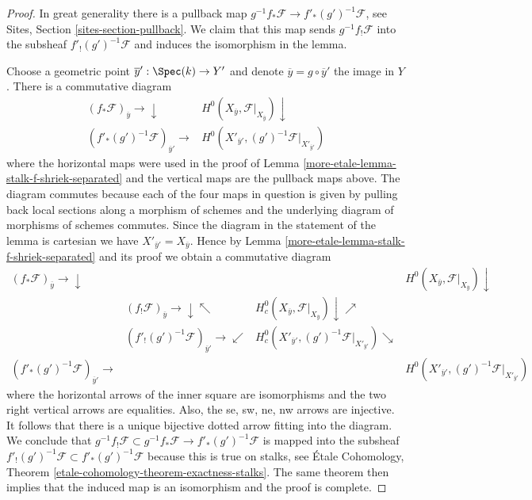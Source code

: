 \begin{proof}
In great generality there is a pullback map
$g^{-1}f_*\mathcal{F} \to f'_*(g')^{-1}\mathcal{F}$, see
Sites, Section \ref{sites-section-pullback}.
We claim that this map sends $g^{-1}f_!\mathcal{F}$
into the subsheaf $f'_!(g')^{-1}\mathcal{F}$
and induces the isomorphism in the lemma.

\medskip\noindent
Choose a geometric point $\overline{y}': \Spec(k) \to Y'$ and denote
$\overline{y} = g \circ \overline{y}'$ the image in $Y$. There is a
commutative diagram
$$
\begin{array}{cc}(f_*\mathcal{F})_{\overline{y}} \longrightarrow\downarrow & H^0(X_{\overline{y}}, \mathcal{F}|_{X_{\overline{y}}}) \downarrow \\ (f'_*(g')^{-1}\mathcal{F})_{\overline{y}'} \longrightarrow & H^0(X'_{\overline{y}'}, (g')^{-1}\mathcal{F}|_{X'_{\overline{y}'}})\end{array}
$$
where the horizontal maps were used in the proof of
Lemma \ref{more-etale-lemma-stalk-f-shriek-separated}
and the vertical maps are the pullback maps above.
The diagram commutes because each of the four maps
in question is given by pulling back local sections along
a morphism of schemes and the underlying diagram of morphisms
of schemes commutes. Since the diagram in the statement of the lemma
is cartesian we have $X'_{\overline{y}'} = X_{\overline{y}}$.
Hence by Lemma \ref{more-etale-lemma-stalk-f-shriek-separated}
and its proof we obtain a commutative diagram
$$
\begin{array}{cccc}(f_*\mathcal{F})_{\overline{y}} \longrightarrow\downarrow &  &  & H^0(X_{\overline{y}}, \mathcal{F}|_{X_{\overline{y}}}) \downarrow \\  & (f_!\mathcal{F})_{\overline{y}} \longrightarrow\downarrow\nwarrow & H^0_c(X_{\overline{y}}, \mathcal{F}|_{X_{\overline{y}}}) \downarrow\nearrow &  \\  & (f'_!(g')^{-1}\mathcal{F})_{\overline{y}'} \longrightarrow\swarrow & H^0_c(X'_{\overline{y}'}, (g')^{-1}\mathcal{F}|_{X'_{\overline{y}'}}) \searrow &  \\ (f'_*(g')^{-1}\mathcal{F})_{\overline{y}'} \longrightarrow &  &  & H^0(X'_{\overline{y}'}, (g')^{-1}\mathcal{F}|_{X'_{\overline{y}'}})\end{array}
$$
where the horizontal arrows of the inner square are isomorphisms
and the two right vertical arrows are equalities. Also, the
se, sw, ne, nw arrows are injective. It follows that there is a unique
bijective dotted arrow fitting into the diagram. We conclude that
$g^{-1}f_!\mathcal{F} \subset g^{-1}f_*\mathcal{F} \to f'_*(g')^{-1}\mathcal{F}$
is mapped into the subsheaf
$f'_!(g')^{-1}\mathcal{F} \subset f'_*(g')^{-1}\mathcal{F}$
because this is true on stalks, see
\'Etale Cohomology, Theorem \ref{etale-cohomology-theorem-exactness-stalks}.
The same theorem then implies that the induced map is an isomorphism
and the proof is complete.
\end{proof}

